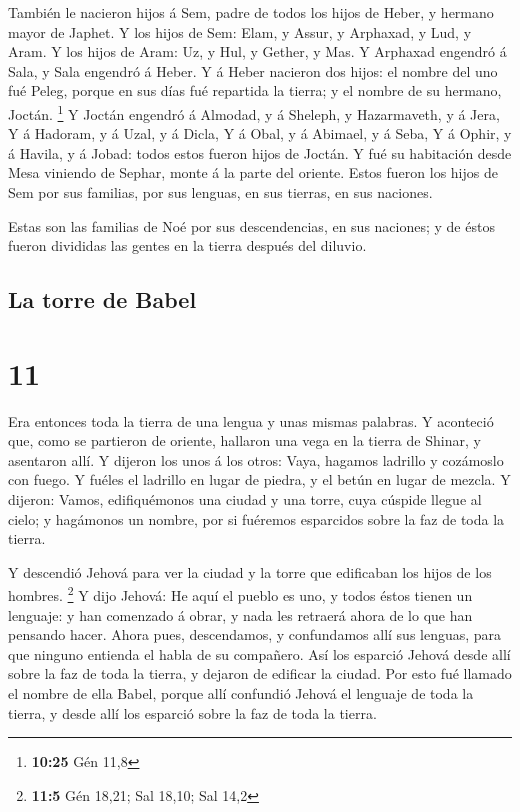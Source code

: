  También le nacieron hijos á Sem, padre de todos los hijos
de Heber, y hermano mayor de Japhet.  Y los hijos de Sem:
Elam, y Assur, y Arphaxad, y Lud, y Aram.  Y los hijos de
Aram: Uz, y Hul, y Gether, y Mas.  Y Arphaxad engendró á
Sala, y Sala engendró á Heber.  Y á Heber nacieron dos
hijos: el nombre del uno fué Peleg, porque en sus días fué repartida la
tierra; y el nombre de su hermano, Joctán. \footnote{\textbf{10:25} Gén
  11,8}  Y Joctán engendró á Almodad, y á Sheleph, y
Hazarmaveth, y á Jera,  Y á Hadoram, y á Uzal, y á Dicla,
 Y á Obal, y á Abimael, y á Seba,  Y á Ophir,
y á Havila, y á Jobad: todos estos fueron hijos de Joctán. 
Y fué su habitación desde Mesa viniendo de Sephar, monte á la parte del
oriente.  Estos fueron los hijos de Sem por sus familias,
por sus lenguas, en sus tierras, en sus naciones.

 Estas son las familias de Noé por sus descendencias, en
sus naciones; y de éstos fueron divididas las gentes en la tierra
después del diluvio.

\hypertarget{la-torre-de-babel}{%
\subsection{La torre de Babel}\label{la-torre-de-babel}}

\hypertarget{section-10}{%
\section{11}\label{section-10}}

 Era entonces toda la tierra de una lengua y unas mismas
palabras.  Y aconteció que, como se partieron de oriente,
hallaron una vega en la tierra de Shinar, y asentaron allí. 
Y dijeron los unos á los otros: Vaya, hagamos ladrillo y cozámoslo con
fuego. Y fuéles el ladrillo en lugar de piedra, y el betún en lugar de
mezcla.  Y dijeron: Vamos, edifiquémonos una ciudad y una
torre, cuya cúspide llegue al cielo; y hagámonos un nombre, por si
fuéremos esparcidos sobre la faz de toda la tierra.

 Y descendió Jehová para ver la ciudad y la torre que
edificaban los hijos de los hombres. \footnote{\textbf{11:5} Gén 18,21;
  Sal 18,10; Sal 14,2}  Y dijo Jehová: He aquí el pueblo es
uno, y todos éstos tienen un lenguaje: y han comenzado á obrar, y nada
les retraerá ahora de lo que han pensando hacer.  Ahora
pues, descendamos, y confundamos allí sus lenguas, para que ninguno
entienda el habla de su compañero.  Así los esparció Jehová
desde allí sobre la faz de toda la tierra, y dejaron de edificar la
ciudad.  Por esto fué llamado el nombre de ella Babel,
porque allí confundió Jehová el lenguaje de toda la tierra, y desde allí
los esparció sobre la faz de toda la tierra.

